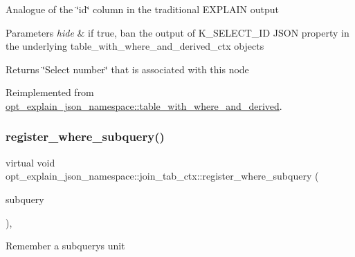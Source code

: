 Analogue of the \char`\"{}id\char`\"{} column in the traditional E\+X\+P\+L\+A\+IN output


\begin{DoxyParams}{Parameters}
{\em hide} & if true, ban the output of K\+\_\+\+S\+E\+L\+E\+C\+T\+\_\+\+ID J\+S\+ON property in the underlying table\+\_\+with\+\_\+where\+\_\+and\+\_\+derived\+\_\+ctx objects\\
\hline
\end{DoxyParams}
\begin{DoxyReturn}{Returns}
\char`\"{}\+Select number\char`\"{} that is associated with this node 
\end{DoxyReturn}


Reimplemented from \mbox{\hyperlink{classopt__explain__json__namespace_1_1table__with__where__and__derived_ab71bf926210b34494e172ff100cc348b}{opt\+\_\+explain\+\_\+json\+\_\+namespace\+::table\+\_\+with\+\_\+where\+\_\+and\+\_\+derived}}.

\mbox{\label{classopt__explain__json__namespace_1_1join__tab__ctx_acac0818845848eba4191f94df3281973}} 
\subsubsection{\texorpdfstring{register\+\_\+where\+\_\+subquery()}{register\_where\_subquery()}}
{\footnotesize\ttfamily virtual void opt\+\_\+explain\+\_\+json\+\_\+namespace\+::join\+\_\+tab\+\_\+ctx\+::register\+\_\+where\+\_\+subquery (\begin{DoxyParamCaption}\item[{S\+E\+L\+E\+C\+T\+\_\+\+L\+E\+X\+\_\+\+U\+N\+IT $\ast$}]{subquery }\end{DoxyParamCaption})\hspace{0.3cm}{\ttfamily [inline]}, {\ttfamily [virtual]}}

Remember a subquery\textquotesingle{}s unit

